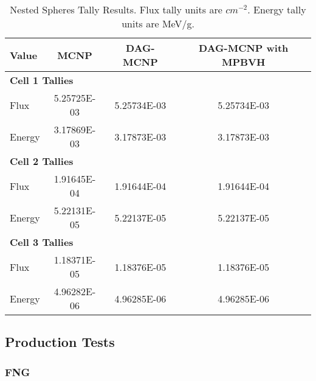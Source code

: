   \begin{table}[H]
    \small
    \begin{center}
      \begin{tabular}{lccc}
        \toprule
        Value & MCNP & DAG-MCNP & DAG-MCNP with MPBVH \\
        \toprule
        \multicolumn{4}{l}{\textbf{Cell 1 Tallies}} \\
        \hline
        Flux   & 5.25725E-03 & 5.25734E-03 & 5.25734E-03 \\
        Energy & 3.17869E-03 & 3.17873E-03 & 3.17873E-03 \\
        \hline
        \multicolumn{4}{l}{\textbf{Cell 2 Tallies}}      \\
        \hline
        Flux   & 1.91645E-04 & 1.91644E-04 & 1.91644E-04 \\
        Energy & 5.22131E-05 & 5.22137E-05 & 5.22137E-05 \\
        \hline
        \multicolumn{4}{l}{\textbf{Cell 3 Tallies}}      \\
        \hline
        Flux   & 1.18371E-05 & 1.18376E-05 & 1.18376E-05 \\
        Energy & 4.96282E-06 & 4.96285E-06 & 4.96285E-06 \\
        \bottomrule
      \end{tabular}
      \caption[Nested Spheres Tally Results.]{Nested Spheres Tally Results. Flux
        tally units are $cm^{-2}$. Energy tally units are MeV/g.}
      \label{nestedspheres}
    \end{center}
  \end{table}

\subsection{Production Tests}\label{appsec:mpbvh_production_tests}

\subsubsection{FNG}

